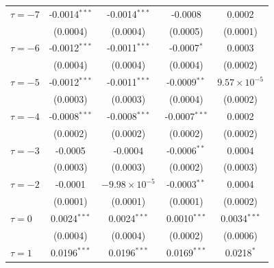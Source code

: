 \begin{tabular}{lcccc}
   $\tau = -7$                                  & -0.0014$^{***}$ & -0.0014$^{***}$        & -0.0008                     & 0.0002\\   
                                                & (0.0004)        & (0.0004)               & (0.0005)                    & (0.0001)\\   
   $\tau = -6$                                  & -0.0012$^{***}$ & -0.0011$^{***}$        & -0.0007$^{*}$               & 0.0003\\   
                                                & (0.0004)        & (0.0004)               & (0.0004)                    & (0.0002)\\   
   $\tau = -5$                                  & -0.0012$^{***}$ & -0.0011$^{***}$        & -0.0009$^{**}$              & $9.57\times 10^{-5}$\\    
                                                & (0.0003)        & (0.0003)               & (0.0004)                    & (0.0002)\\   
   $\tau = -4$                                  & -0.0008$^{***}$ & -0.0008$^{***}$        & -0.0007$^{***}$             & 0.0002\\   
                                                & (0.0002)        & (0.0002)               & (0.0002)                    & (0.0002)\\   
   $\tau = -3$                                  & -0.0005         & -0.0004                & -0.0006$^{**}$              & 0.0004\\   
                                                & (0.0003)        & (0.0003)               & (0.0002)                    & (0.0003)\\   
   $\tau = -2$                                  & -0.0001         & $-9.98\times 10^{-5}$  & -0.0003$^{**}$              & 0.0004\\   
                                                & (0.0001)        & (0.0001)               & (0.0001)                    & (0.0002)\\   
   $\tau = 0$                                   & 0.0024$^{***}$  & 0.0024$^{***}$         & 0.0010$^{***}$              & 0.0034$^{***}$\\   
                                                & (0.0004)        & (0.0004)               & (0.0002)                    & (0.0006)\\   
   $\tau = 1$                                   & 0.0196$^{***}$  & 0.0196$^{***}$         & 0.0169$^{***}$              & 0.0218$^{*}$\\   

\end{tabular}
